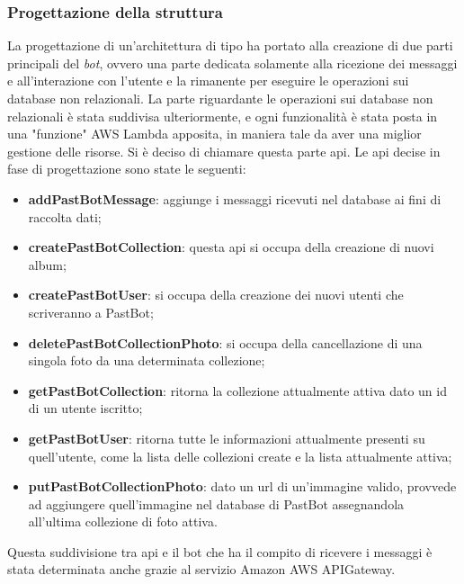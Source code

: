 \subsubsection{Progettazione della struttura }
La progettazione di un'architettura di tipo  ha
portato alla creazione di due parti principali del \textit{bot}, ovvero una
parte dedicata solamente alla ricezione dei messaggi e all'interazione con
l'utente e la rimanente per eseguire le operazioni sui database non relazionali.
La parte riguardante le operazioni sui database non relazionali è stata
suddivisa ulteriormente, e ogni funzionalità è stata posta in una "funzione"
AWS Lambda apposita, in maniera tale da aver una miglior gestione delle
risorse. Si è deciso di chiamare questa parte \gls{api}. Le \gls{api} decise in
fase di progettazione sono state le seguenti:
\begin{itemize}
  \item \textbf{addPastBotMessage}: aggiunge i messaggi ricevuti nel database
ai fini di raccolta dati;

  \item \textbf{createPastBotCollection}: questa \gls{api} si occupa della
creazione di nuovi album;

  \item \textbf{createPastBotUser}: si occupa della creazione dei nuovi utenti
che scriveranno a PastBot;

  \item \textbf{deletePastBotCollectionPhoto}: si occupa della cancellazione di
una singola foto da una determinata collezione;

  \item \textbf{getPastBotCollection}: ritorna la collezione attualmente attiva
dato un id di un utente iscritto;

  \item \textbf{getPastBotUser}: ritorna tutte le informazioni attualmente
presenti su quell'utente, come la lista delle collezioni create e la lista
attualmente attiva;

  \item \textbf{putPastBotCollectionPhoto}: dato un \gls{url} di un'immagine
valido, provvede ad aggiungere quell'immagine nel database di PastBot
assegnandola all'ultima collezione di foto attiva.
\end{itemize}

Questa suddivisione tra \gls{api} e il bot che ha il compito di ricevere i
messaggi è stata determinata anche grazie al servizio Amazon AWS APIGateway.

